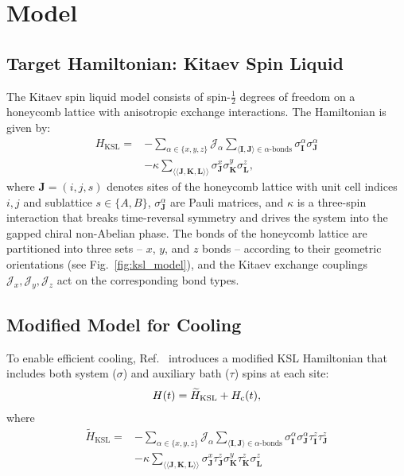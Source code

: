 \documentclass[twocolumn,
aps,
prx,
showpacs,
amsmath,
amssymb,
floatfix,
longbibliography,
superscriptaddress,
eprint]
{revtex4-1}
\begin{document}
\section{Model}

\subsection{Target Hamiltonian: Kitaev Spin Liquid}

The Kitaev spin liquid model consists of spin-$\frac{1}{2}$ degrees of freedom on a honeycomb lattice with anisotropic exchange interactions. The Hamiltonian is given by:
\begin{align}
H_{\text{KSL}}=&-\sum_{\alpha\in\{x,y,z\}}\mathcal{J}_{\alpha}\sum_{\langle\mathbf{I},\mathbf{J}\rangle\in \alpha\text{-bonds}}\sigma_{\mathbf{I}}^{\alpha}\sigma_{\mathbf{J}}^{\alpha}
\nonumber\\
&-\kappa\sum_{\langle\langle\mathbf{J},\mathbf{K},\mathbf{L}\rangle\rangle}\sigma_{\mathbf{J}}^{x}\sigma_{\mathbf{K}}^{y}\sigma_{\mathbf{L}}^{z},
\label{eq: KSL}
\end{align}
where $\mathbf{J} = (i,j,s)$ denotes sites of the honeycomb lattice with unit cell indices $i,j$ and sublattice $s\in\{A,B\}$, $\sigma_{\mathbf{J}}^\alpha$ are Pauli matrices, and $\kappa$ is a three-spin interaction that breaks time-reversal symmetry and drives the system into the gapped chiral non-Abelian phase. The bonds of the honeycomb lattice are partitioned into three sets -- $x$, $y$, and $z$ bonds -- according to their geometric orientations (see Fig.~\ref{fig:ksl_model}), and the Kitaev exchange couplings $\mathcal{J}_x, \mathcal{J}_y, \mathcal{J}_z$ act on the corresponding bond types.

\subsection{Modified Model for Cooling}

To enable efficient cooling, Ref.~\cite{Kishony_2025} introduces a modified KSL Hamiltonian that includes both system ($\sigma$) and auxiliary bath ($\tau$) spins at each site:
\begin{align}
H(t)=\widetilde{H}_{\text{KSL}}+H_{{\rm c}}(t),
\label{eq:H_KSL}
\end{align}
where
\begin{align}
\widetilde{H}_{\text{KSL}}=&-\sum_{\alpha\in\{x,y,z\}}\mathcal{J}_{\alpha}\sum_{\langle \mathbf{I},\mathbf{J}\rangle\in \alpha\text{-bonds}}\sigma_{\mathbf{I}}^{\alpha}\sigma_{\mathbf{J}}^{\alpha}\tau_{\mathbf{I}}^{z}\tau_{\mathbf{J}}^{z}\nonumber\\
&-\kappa\sum_{\langle\langle \mathbf{J},\mathbf{K},\mathbf{L}\rangle\rangle}\sigma_{\mathbf{J}}^x\tau_{\mathbf{J}}^z\sigma_{\mathbf{K}}^y\tau_{\mathbf{K}}^z\sigma_{\mathbf{L}}^z
\label{eq: KSL with spins}
\end{align}
\end{document}
